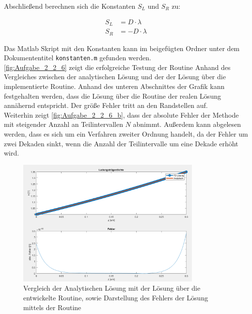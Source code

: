 \documentclass[
	pagesize,
	fontsize=12pt,
	paper=a4,
	oneside,
   reqno
]{scrartcl}
\begin{document}
Abschließend berechnen sich die Konstanten $S_L$ und $S_R$ zu:

\begin{align*}
   S_L &= D \cdot \lambda \\
   S_R &= -D \cdot \lambda
\end{align*}

Das Matlab Skript mit den Konstanten kann im beigefügten Ordner unter dem Dokumententitel \texttt{konstanten.m} gefunden werden. \\

\autoref{fig:Aufgabe_2_2_6} zeigt die erfolgreiche Testung der Routine Anhand des Vergleiches zwischen der analytischen Lösung und der der Lösung über die implementierte Routine. Anhand des unteren Abschnittes der Grafik kann festgehalten werden, dass die Lösung über die Routine der realen Lösung annähernd entspricht. Der größe Fehler tritt an den Randstellen auf. \\

Weiterhin zeigt \autoref{fig:Aufgabe_2_2_6_b}, dass der absolute Fehler der Methode mit steigender Anzahl an Teilintervallen $N$ abnimmt. Außerdem kann abgelesen werden, dass es sich um ein Verfahren zweiter Ordnung handelt, da der Fehler um zwei Dekaden sinkt, wenn die Anzahl der Teilintervalle um eine Dekade erhöht wird.

\begin{figure}[H]
   \centering
   \includegraphics[width=0.82\textwidth]{Bilder/Aufgabe_2_2_6.png}
   \caption[Test der Routine nichtlinear stationär]{Vergleich der Analytischen Lösung mit der Lösung über die entwickelte Routine, sowie Darstellung des Fehlers der Lösung mittels der Routine}
   \label{fig:Aufgabe_2_2_6}
\end{figure}
\end{document}
